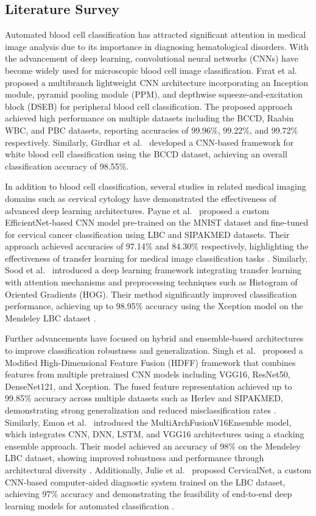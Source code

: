 \documentclass[preprint,12pt]{elsarticle}
\begin{document}
\subsection{Literature Survey}

Automated blood cell classification has attracted significant attention in medical image analysis due to its importance in diagnosing hematological disorders. With the advancement of deep learning, convolutional neural networks (CNNs) have become widely used for microscopic blood cell image classification. Fırat et al.~\cite{b23} proposed a multibranch lightweight CNN architecture incorporating an Inception module, pyramid pooling module (PPM), and depthwise squeeze-and-excitation block (DSEB) for peripheral blood cell classification. The proposed approach achieved high performance on multiple datasets including the BCCD, Raabin WBC, and PBC datasets, reporting accuracies of 99.96\%, 99.22\%, and 99.72\% respectively. Similarly, Girdhar et al.~\cite{b24} developed a CNN-based framework for white blood cell classification using the BCCD dataset, achieving an overall classification accuracy of 98.55\%.

In addition to blood cell classification, several studies in related medical imaging domains such as cervical cytology have demonstrated the effectiveness of advanced deep learning architectures. Payne et al.~\cite{b26} proposed a custom EfficientNet-based CNN model pre-trained on the MNIST dataset and fine-tuned for cervical cancer classification using LBC and SIPAKMED datasets. Their approach achieved accuracies of 97.14\% and 84.30\% respectively, highlighting the effectiveness of transfer learning for medical image classification tasks . Similarly, Sood et al.~\cite{b27} introduced a deep learning framework integrating transfer learning with attention mechanisms and preprocessing techniques such as Histogram of Oriented Gradients (HOG). Their method significantly improved classification performance, achieving up to 98.95\% accuracy using the Xception model on the Mendeley LBC dataset .

Further advancements have focused on hybrid and ensemble-based architectures to improve classification robustness and generalization. Singh et al.~\cite{b28} proposed a Modified High-Dimensional Feature Fusion (HDFF) framework that combines features from multiple pretrained CNN models including VGG16, ResNet50, DenseNet121, and Xception. The fused feature representation achieved up to 99.85\% accuracy across multiple datasets such as Herlev and SIPAKMED, demonstrating strong generalization and reduced misclassification rates . Similarly, Emon et al.~\cite{b29} introduced the MultiArchFusionV16Ensemble model, which integrates CNN, DNN, LSTM, and VGG16 architectures using a stacking ensemble approach. Their model achieved an accuracy of 98\% on the Mendeley LBC dataset, showing improved robustness and performance through architectural diversity . Additionally, Julie et al.~\cite{b30} proposed CervicalNet, a custom CNN-based computer-aided diagnostic system trained on the LBC dataset, achieving 97\% accuracy and demonstrating the feasibility of end-to-end deep learning models for automated classification .
\end{document}
